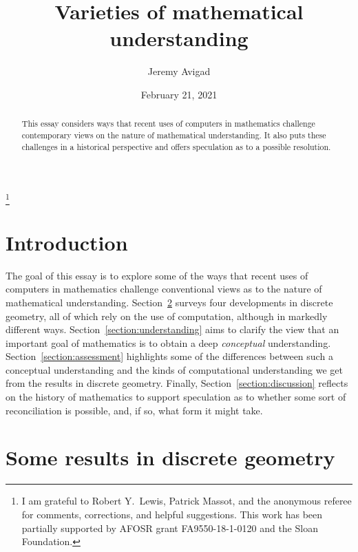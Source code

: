 \documentclass[12pt]{amsart}
\theoremstyle{definition}
\theoremstyle{remark}
\numberwithin{equation}{section}
\begin{document}
\title{Varieties of mathematical understanding}

\author{Jeremy Avigad}
\address{Department of Philosophy, Baker Hall 161, Carnegie Mellon University, Pittsburgh, PA 15213, USA}
\curraddr{}
\thanks{I am grateful to Robert Y.~Lewis, Patrick Massot, and the anonymous referee for comments, corrections, and helpful suggestions. This work has been partially supported by AFOSR grant FA9550-18-1-0120 and the Sloan Foundation.}


\date{February 21, 2021}

\dedicatory{}

\begin{abstract}
This essay considers ways that recent uses of computers in mathematics challenge contemporary views on the nature of mathematical understanding. It also puts these challenges in a historical perspective and offers speculation as to a possible resolution.
\end{abstract}

\maketitle

\section{Introduction}

The goal of this essay is to explore some of the ways that recent uses of computers in mathematics challenge conventional views as to the nature of mathematical understanding. Section~\ref{section:theorems} surveys four developments in discrete geometry, all of which rely on the use of computation, although in markedly different ways. Section~\ref{section:understanding} aims to clarify the view that an important goal of mathematics is to obtain a deep \emph{conceptual} understanding. Section~\ref{section:assessment} highlights some of the differences between such a conceptual understanding and the kinds of computational understanding we get from the results in discrete geometry. Finally, Section~\ref{section:discussion} reflects on the history of mathematics to support speculation as to whether some sort of reconciliation is possible, and, if so, what form it might take.

\section{Some results in discrete geometry}
\label{section:theorems}
\end{document}
